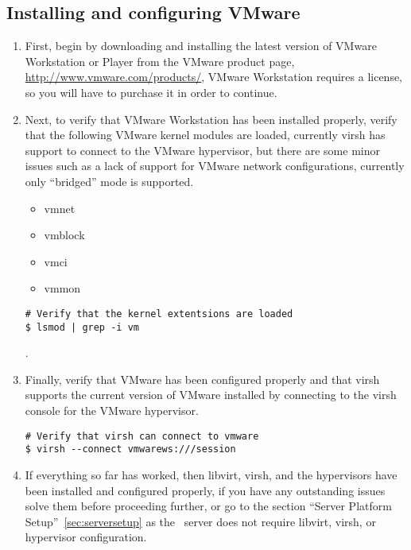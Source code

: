\subsection{Installing and configuring VMware}
\label{sec:debianvmware}
\begin{enumerate}
\item	First, begin by downloading and installing the latest version of VMware Workstation or Player  from the VMware product 
		page, \url{http://www.vmware.com/products/}, VMware Workstation requires a license, so you will have to purchase it
		in order to continue.
		
\item	Next, to verify that VMware Workstation has been installed properly, verify that the following VMware kernel modules 
		are loaded, currently virsh has support to connect to the VMware hypervisor, but there are some minor issues such as
		a lack of support for VMware network configurations, currently only ``bridged'' mode is supported.
		
\begin{itemize}
\item        vmnet
\item        vmblock
\item        vmci
\item        vmmon

\end{itemize}

\lstset{language=bash,caption=Verify VMware Kernel Extensions Loaded}
\begin{lstlisting}
# Verify that the kernel extentsions are loaded
$ lsmod | grep -i vm
\end{lstlisting}

.\item      Finally, verify that VMware has been configured properly and that virsh supports the current version of VMware 
                installed by connecting to the virsh console for the VMware hypervisor.

\lstset{language=bash,caption=Verify VMware Works with Virsh}
\begin{lstlisting}
# Verify that virsh can connect to vmware
$ virsh --connect vmwarews:///session
\end{lstlisting}

\item	If everything so far has worked, then libvirt, virsh, and the hypervisors have been installed and configured properly,
		if you have any outstanding issues solve them before proceeding further, or go to the section ``Server Platform 		
		Setup''~\ref{sec:serversetup} as the \tapper~server does not require libvirt, virsh, or hypervisor configuration.
		
\end{enumerate}




